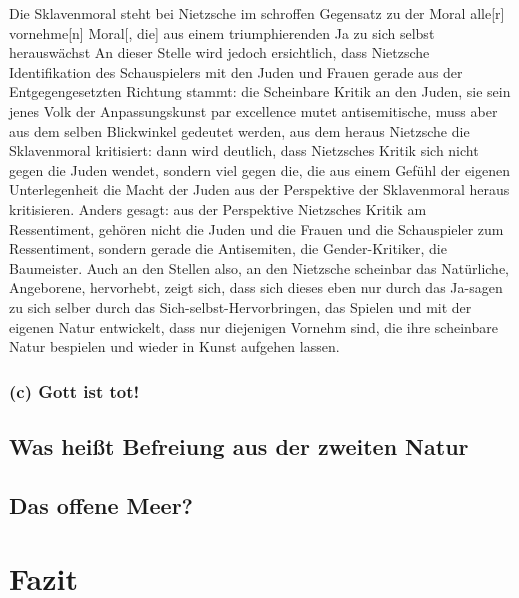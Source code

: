 \documentclass[12pt, a4paper, openany]{report}
\makeatletter
\newcommand\backmatter{ \if@openright \cleardoublepage \else \clearpage \fi }
\makeatother
\begin{document}
Die Sklavenmoral steht bei Nietzsche im schroffen Gegensatz zu der Moral \glqq alle[r] vornehme[n] Moral[, die] aus einem triumphierenden Ja zu sich selbst herauswächst\grqq{} 
An dieser Stelle wird jedoch ersichtlich, dass Nietzsche Identifikation des Schauspielers mit den Juden und Frauen gerade aus der Entgegengesetzten Richtung stammt:
die Scheinbare Kritik an den Juden, sie sein \glqq jenes Volk der Anpassungskunst par excellence\grqq{} mutet antisemitische, muss aber aus dem selben Blickwinkel gedeutet werden, aus dem heraus Nietzsche die Sklavenmoral kritisiert:
dann wird deutlich, dass Nietzsches Kritik sich nicht gegen die Juden wendet, sondern viel gegen die, die aus einem Gefühl der eigenen Unterlegenheit die Macht der Juden aus der Perspektive der Sklavenmoral heraus kritisieren. 
Anders gesagt: aus der Perspektive Nietzsches Kritik am Ressentiment, gehören nicht die Juden und die Frauen und die Schauspieler zum Ressentiment, sondern gerade die Antisemiten, die Gender-Kritiker, die Baumeister. 
Auch an den Stellen also, an den Nietzsche scheinbar das Natürliche, Angeborene, hervorhebt, zeigt sich, dass sich dieses eben nur durch das \glqq Ja-sagen zu sich selber\grqq{} durch das Sich-selbst-Hervorbringen, das Spielen und mit der eigenen \glqq Natur\grqq{} entwickelt, dass nur diejenigen Vornehm sind, die ihre scheinbare Natur bespielen und wieder in Kunst aufgehen lassen.

\subsection{(c) Gott ist tot!}
\section{Was heißt Befreiung aus der zweiten Natur}\label{abschnitt_3}
\section{Das offene Meer?}\label{abschnitt_4}

\chapter{Fazit}

\backmatter

\printbibliography
 
\end{document}

